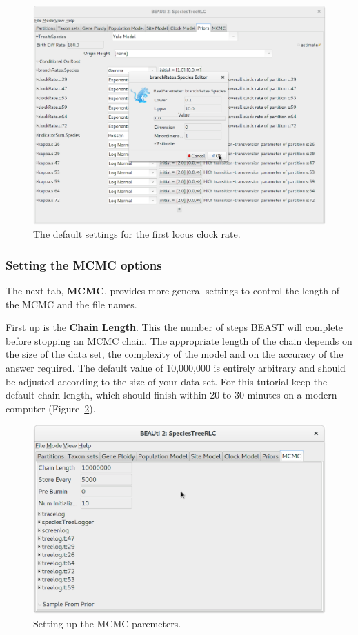 \documentclass{article}
\begin{document}
\begin{figure}[htb!]
\centering
\includegraphics[width=\textwidth]{figures/beauti-branch-rates.png}
\caption{The default settings for the first locus clock rate.}
\label{fig:limits}
\end{figure}

\subsubsection*{Setting the MCMC options }

The next tab, \textbf{MCMC}, provides more general settings to control the
length of the MCMC and the file names.

First up is the \textbf{Chain Length}. This the number of steps BEAST will
complete before stopping an MCMC chain. The appropriate length of the chain
depends on the size of the data set, the complexity of the model and on the
accuracy of the answer required. The default value of 10,000,000 is entirely
arbitrary and should be adjusted according to the size of your data set. For
this tutorial keep the default chain length, which should finish within 20
to 30 minutes on a modern computer (Figure~\ref{fig:mcmc}).

\begin{figure}[htb!]
\centering
\includegraphics[width=\textwidth]{figures/beauti-mcmc.png}
\caption{Setting up the MCMC paremeters.}
\label{fig:mcmc}
\end{figure}
\end{document}
